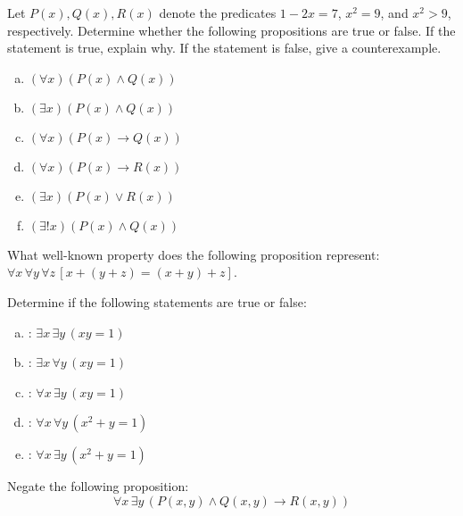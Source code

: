 \documentclass[11pt,letterpaper]{article}
\begin{document}
 Let $P(x), Q(x), R(x)$ denote the predicates $1 - 2x= 7$, $x^2= 9$, and $x^2 > 9$, respectively. Determine whether the following propositions are true or false. If the statement is true, explain why. If the statement is false, give a counterexample. 
        \begin{enumerate}[(a)]
        \item $(\forall x)(P(x) \wedge Q(x))$
        \item $(\exists x)(P(x) \wedge Q(x))$
        \item $(\forall x)(P(x) \to Q(x))$
        \item $(\forall x)(P(x) \to R(x))$
        \item $(\exists x)(P(x) \vee R(x))$
        \item $(\exists! x)(P(x) \wedge Q(x))$ 
        \end{enumerate}





\newpage





 What well-known property does the following proposition represent: $\forall x\, \forall y\, \forall z\, [x + (y + z) = (x + y) + z]$. \pspace





\newpage





 Determine if the following statements are true or false:
	\begin{enumerate}[(a)]
	\item \uans{1.5cm}: $\exists x\, \exists y\, (xy = 1)$
	\item \uans{1.5cm}: $\exists x\, \forall y\, (xy= 1)$
	\item \uans{1.5cm}: $\forall x\, \exists y\, (xy= 1)$
	\item \uans{1.5cm}: $\forall x\, \forall y\, (x^2 + y = 1)$
	\item \uans{1.5cm}: $\forall x\, \exists y\, (x^2 + y= 1)$
	\end{enumerate}





\newpage





 Negate the following proposition:
	\[
	\forall x\, \exists y\, \left( P(x,y) \wedge Q(x,y) \to R(x,y) \right)
	\]
\end{document}
